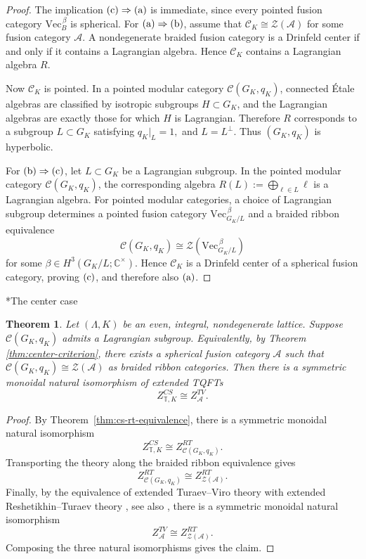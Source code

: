 \documentclass[12pt]{amsart}
\makeatletter
\renewcommand\subsection{\@startsection{subsection}{2}%
  \z@{.5\linespacing\@plus.7\linespacing}{-.5em}%
  {\normalfont\bfseries}}
\numberwithin{equation}{section}
\newtheorem{theorem}{Theorem}[section]
\theoremstyle{definition}
\newcommand{\VecCat}{\mathrm{Vec}}
\makeatother
\begin{document}
\begin{proof}
The implication $\rm(c)\Rightarrow (a)$ is immediate, since every pointed fusion
category $\VecCat_B^{\,\beta}$ is spherical. For $\rm(a)\Rightarrow (b)$, assume that $\mathcal C_K \cong \mathcal Z(\mathcal A)$ for some fusion category $\mathcal A$. A nondegenerate braided fusion category is a
Drinfeld center if and only if it contains a Lagrangian algebra. Hence $\mathcal C_K$
contains a Lagrangian algebra $R$.

Now $\mathcal C_K$ is pointed. In a pointed modular category $\mathcal C(G_K,q_K)$,
connected Étale algebras are classified by isotropic subgroups $H\subset G_K$, and the
Lagrangian algebras are exactly those for which $H$ is Lagrangian. Therefore $R$
corresponds to a subgroup $L\subset G_K$ satisfying $q_K|_L=1,$ and $
L=L^\perp .$ Thus $(G_K,q_K)$ is hyperbolic.

For $\rm(b)\Rightarrow (c)$, let $L\subset G_K$ be a Lagrangian subgroup. In the pointed modular category $\mathcal C(G_K,q_K)$, the corresponding algebra $R(L):=\bigoplus_{\ell\in L}\ell$ is a Lagrangian algebra. For pointed modular categories, a choice of Lagrangian subgroup determines a pointed fusion category $\VecCat_{G_K/L}^{\,\beta}$ and a braided ribbon equivalence
$$
\mathcal C(G_K,q_K)\cong \mathcal Z(\VecCat_{G_K/L}^{\,\beta})
$$
for some $\beta\in H^3(G_K/L;\mathbb C^\times)$. Hence $\mathcal C_K$ is a Drinfeld
center of a spherical fusion category, proving $\rm(c)$, and therefore also $\rm(a)$.
\end{proof}

\subsection*{The center case}


\begin{theorem}
\label{thm:center-case}
Let $(\Lambda,K)$ be an even, integral, nondegenerate lattice. Suppose $\mathcal C(G_K,q_K)$  admits a Lagrangian subgroup. Equivalently, by Theorem \ref{thm:center-criterion}, there exists a spherical fusion category $\mathcal{A}$ such that $\mathcal C(G_K,q_K)\cong \mathcal Z(\mathcal A)$ as braided ribbon categories. Then there is a symmetric monoidal natural isomorphism of extended TQFTs
$$
Z^{CS}_{\mathbb T,K}\cong Z^{TV}_{\mathcal A}.
$$
\end{theorem}

\begin{proof}
By Theorem~\ref{thm:cs-rt-equivalence}, there is a symmetric monoidal natural
isomorphism
$$
Z^{CS}_{\mathbb T,K}\cong Z^{RT}_{\mathcal C(G_K,q_K)}.
$$
Transporting the theory along the braided ribbon equivalence gives
$$
Z^{RT}_{\mathcal C(G_K,q_K)}\cong Z^{RT}_{\mathcal Z(\mathcal A)}.
$$
Finally, by the equivalence of extended Turaev--Viro theory with extended Reshetikhin--Turaev theory \cite[Theorem 3.1]{Balsam10}, see also \cite{BK2010,TV2017}, there is a symmetric monoidal natural isomorphism
$$
Z^{TV}_{\mathcal A}\cong Z^{RT}_{ \mathcal Z(\mathcal A)}.
$$
Composing the three natural isomorphisms gives the claim.
\end{proof}
\end{document}
